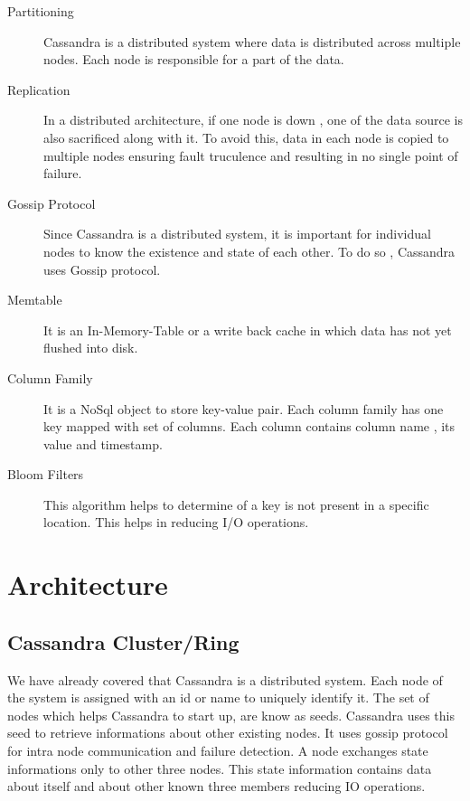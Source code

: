 \documentclass[9pt,twocolumn,twoside]{styles/osajnl}
\begin{document}
\begin{description}
  \item[Partitioning] \cite{www-dzone}Cassandra is a distributed system where data is distributed across multiple nodes. Each node is responsible for a part of the data.
  \item[Replication] \cite{www-dzone}In a distributed architecture, if one node is down , one of the data source is also sacrificed along with it. To avoid this, data in each node is copied to multiple nodes ensuring fault truculence and resulting in no single point of failure.
  \item[Gossip Protocol] \cite{wiki-gossip}Since Cassandra is a distributed system, it is important for individual nodes to know the existence and state of each other. To do so , Cassandra uses Gossip protocol.
  \item[Memtable] \cite{www-dzone}It is an In-Memory-Table or a write back cache in which data has not yet flushed into disk.
  \item[Column Family] \cite{wiki-columnfamily}It is a NoSql object to store key-value pair. Each column family has one key mapped with set of columns. Each column contains column name , its value and timestamp.
  \item[Bloom Filters] \cite{www-dzone}This algorithm helps to determine of a key is not present in a specific location. This helps in reducing I/O operations.
\end{description}

\section{Architecture}

\subsection{Cassandra Cluster/Ring}

We have already covered that Cassandra is a distributed system. Each node of the system is assigned with an id or name to uniquely identify it. The set of nodes which helps Cassandra to start up, are know as seeds. Cassandra uses this seed to retrieve informations about other existing nodes. It uses gossip protocol for intra node communication and failure detection. A node exchanges state informations only to other three nodes. This state information contains data about itself and about other known three members reducing IO operations.
\end{document}
